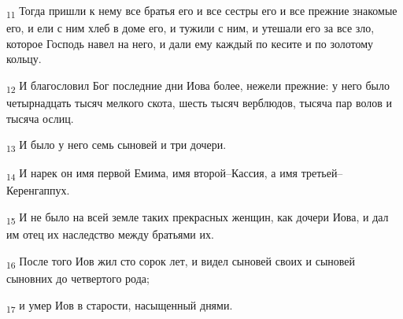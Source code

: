 \begin{tcolorbox}
\textsubscript{11} Тогда пришли к нему все братья его и все сестры его и все прежние знакомые его, и ели с ним хлеб в доме его, и тужили с ним, и утешали его за все зло, которое Господь навел на него, и дали ему каждый по кесите и по золотому кольцу.
\end{tcolorbox}
\begin{tcolorbox}
\textsubscript{12} И благословил Бог последние дни Иова более, нежели прежние: у него было четырнадцать тысяч мелкого скота, шесть тысяч верблюдов, тысяча пар волов и тысяча ослиц.
\end{tcolorbox}
\begin{tcolorbox}
\textsubscript{13} И было у него семь сыновей и три дочери.
\end{tcolorbox}
\begin{tcolorbox}
\textsubscript{14} И нарек он имя первой Емима, имя второй--Кассия, а имя третьей--Керенгаппух.
\end{tcolorbox}
\begin{tcolorbox}
\textsubscript{15} И не было на всей земле таких прекрасных женщин, как дочери Иова, и дал им отец их наследство между братьями их.
\end{tcolorbox}
\begin{tcolorbox}
\textsubscript{16} После того Иов жил сто сорок лет, и видел сыновей своих и сыновей сыновних до четвертого рода;
\end{tcolorbox}
\begin{tcolorbox}
\textsubscript{17} и умер Иов в старости, насыщенный днями.
\end{tcolorbox}
